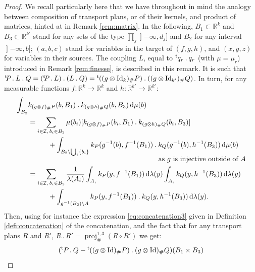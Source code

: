 \documentclass[10pt,a4paper]{article}
\newcommand{\ldot}{\mathbin{.}}
\theoremstyle{plain}
\theoremstyle{definition}
\newcommand{\dd}{\mathrm{d}}
\newcommand{\Id}{\operatorname{Id}}
\newcommand{\trans}{{}^{\mathrm{t}}\mkern-1mu}
\newcommand{\la}{\lambda}
\newcommand{\R}{\mathbb{R}}
\newcommand{\pr}{\operatorname{proj}}
\newcommand{\op}{\mathopen}
\providecommand{\oldbigcup}{\bigcup}
\begin{document}
\begin{proof} We recall particularly here that we have throughout in mind the analogy between composition of transport plans, or of their kernels, and product of matrices, hinted at in Remark \ref{rem:matrix}. In the following, $B_1\subset\R^k$ and $B_3\subset\R^{k'}$ stand for any sets of the type $\prod_j\op]-\infty,d_j]$ and $B_2$ for any interval $\op]-\infty,b]$; $(a,b,c)$ stand for variables in the target of $(f,g,h)$, and $(x,y,z)$ for variables in their sources. The coupling $L$, equal to $\trans q_r\ldot q_r$ (with $\mu=\mu_r$) introduced in Remark \ref{rem:finesse}, is described in this remark. It is such that $\trans\!P\ldot L\ldot Q=(\trans\!P\ldot L)\ldot(L\ldot Q)=\trans((g\otimes \Id_{k})_\#P)\ldot((g\otimes \Id_{k'})_\#Q)$. In turn, for any measurable functions $f:\R^k\to\R^k$ and $h:\R^{k'}\to\R^{k'}$:\vspace*{-3pt}
\begin{equation}\label{eq:prelim_distributivite}
\begin{aligned}
\int_{B_2}&k_{(g\otimes f)_\#P}(b,B_1)\ldot k_{(g \otimes h)_\#Q}(b,B_3)\,\dd\mu(b)\\
&=\sum_{i\in\mathcal{I},\,b_i\in B_2}\mu(b_i)[k_{(g\otimes f)_\#P}(b_i,B_1)\ldot k_{(g\otimes h)_\#Q}(b_i,B_3)]\\
&\hspace*{1cm}+\int_{B_2\setminus\oldbigcup_i\{b_i\}}k_{P}(g^{-1}(b),f^{-1}(B_1))\ldot k_{Q}(g^{-1}(b),h^{-1}(B_3))\,\dd\mu(b)\\[-5pt]
&\hspace*{6.5cm}\text{as $g$ is injective outside of $A$}\\
&=\sum_{i\in \mathcal{I},\,b_i\in B_2}\frac1{\la(A_i)}\int_{A_i}k_{P}(y,f^{-1}(B_1))\,\dd\la(y)\int_{A_i}k_{Q}(y,h^{-1}(B_3))\,\dd\la(y)\\
&\hspace*{1cm}+\int_{g^{-1}(B_2)\setminus A}k_{P}(y,f^{-1}(B_1))\ldot k_{Q}(y,h^{-1}(B_3))\,\dd\la(y).
\end{aligned}
\end{equation}
Then, using for instance the expression \eqref{eq:concatenation3} given in Definition \ref{defi:concatenation} of the concatenation, and the fact that for any transport plans $R$ and $R'$, $R\ldot R'=\pr^{1,3}_\#(R\circ R')$ we get:\vspace*{-3pt}
\begin{align*}
(\trans P\ldot Q&-\trans((g\otimes \Id)_\#P)\ldot(g\otimes \Id)_\#Q)(B_1\times B_3)\\

\end{align*}
\end{proof}
\end{document}
